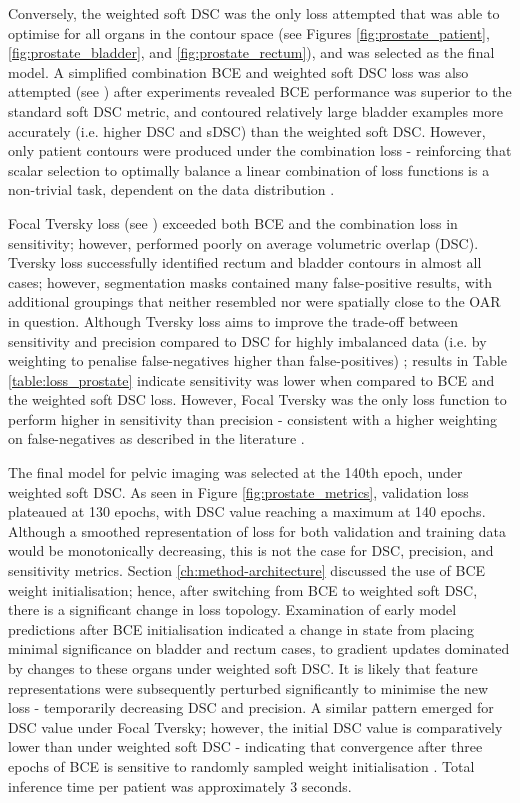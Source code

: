 Conversely, the weighted soft DSC was the only loss attempted that was able to
optimise for all organs in the contour space (see Figures
\ref{fig:prostate_patient}, \ref{fig:prostate_bladder}, and
\ref{fig:prostate_rectum}), and was selected as the final model. A simplified
combination BCE and weighted soft DSC loss was also attempted (see
\cite{taghanaki2018}) after experiments revealed BCE performance was superior to
the standard soft DSC metric, and contoured relatively large bladder examples
more accurately (i.e. higher DSC and sDSC) than the weighted soft DSC. However,
only patient contours were produced under the combination loss - reinforcing that
scalar selection to optimally balance a linear combination of loss functions is
a non-trivial task, dependent on the data distribution \cite{Bertels2019}.
 
Focal Tversky loss (see \cite{Khan2019}) exceeded both BCE and the combination
loss in sensitivity; however, performed poorly on average volumetric overlap
(DSC). Tversky loss successfully identified rectum and bladder contours in
almost all cases; however, segmentation masks contained many false-positive
results, with additional groupings that neither resembled nor were spatially
close to the OAR in question. Although Tversky loss aims to improve the
trade-off between sensitivity and precision compared to DSC for highly
imbalanced data (i.e. by weighting to penalise false-negatives higher than
false-positives) \cite{taghanaki2018}; results in Table
\ref{table:loss_prostate} indicate sensitivity was lower when compared to BCE
and the weighted soft DSC loss. However, Focal Tversky was the only loss
function to perform higher in sensitivity than precision - consistent with a
higher weighting on false-negatives as described in the literature
\cite{Khan2019}.



The final model for pelvic imaging was selected at the 140th epoch, under
weighted soft DSC. As seen in Figure \ref{fig:prostate_metrics}, validation loss
plateaued at 130 epochs, with DSC value reaching a maximum at 140 epochs.
Although a smoothed representation of loss for both validation and training data
would be monotonically decreasing, this is not the case for DSC, precision, and
sensitivity metrics. Section \ref{ch:method-architecture} discussed the use of
BCE weight initialisation; hence, after switching from BCE to weighted soft DSC,
there is a significant change in loss topology. Examination of early model
predictions after BCE initialisation indicated a change in state from placing
minimal significance on bladder and rectum cases, to gradient updates dominated
by changes to these organs under weighted soft DSC. It is likely that feature
representations were subsequently perturbed significantly to minimise the new
loss - temporarily decreasing DSC and precision. A similar pattern emerged for
DSC value under Focal Tversky; however, the initial DSC value is comparatively
lower than under weighted soft DSC - indicating that convergence after three
epochs of BCE is sensitive to randomly sampled weight initialisation
\cite{Ronneberger_2015}. Total inference time per patient was approximately 3
seconds.

